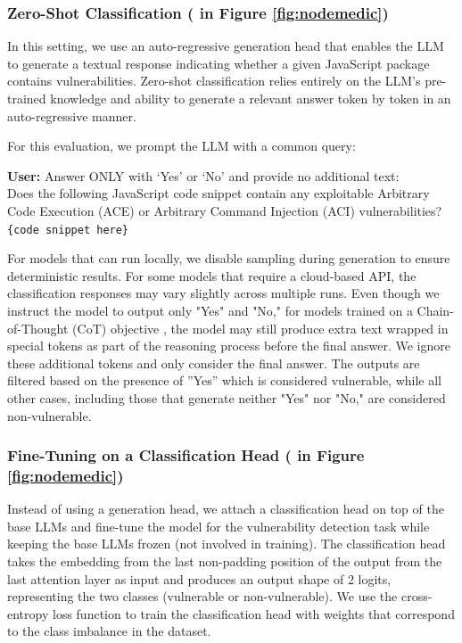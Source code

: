 \documentclass[12pt,openany,oneside,table]{cmuthesis}
\begin{document}
\subsubsection{Zero-Shot Classification \textup{( in Figure \ref{fig:nodemedic})}}
 
In this setting, we use an auto-regressive generation head that enables the LLM to generate a textual response indicating whether a given JavaScript package contains vulnerabilities. 
%
Zero-shot classification relies entirely on the LLM's pre-trained knowledge and ability to generate a relevant answer token by token in an auto-regressive manner.

For this evaluation, we prompt the LLM with a common query:
\begin{tcolorbox}[colback=gray!10, colframe=black, arc=3mm, boxrule=0.8pt]
    \textbf{User:} Answer ONLY with ‘Yes’ or ‘No’ and provide no additional text:\\
    Does the following JavaScript code snippet contain any exploitable Arbitrary Code Execution (ACE) or Arbitrary Command Injection (ACI) vulnerabilities?\\
    
    \texttt{\{code snippet here\}}
\end{tcolorbox}

For models that can run locally, we disable sampling during generation to ensure deterministic results. For some models that require a cloud-based API, the classification responses may vary slightly across multiple runs. 
Even though we instruct the model to output only "Yes" and "No," for models trained on a Chain-of-Thought (CoT) objective \cite{wei2022chain}, the model may still produce extra text wrapped in special tokens as part of the reasoning process before the final answer. We ignore these additional tokens and only consider the final answer.
%
The outputs are filtered based on the presence of ''Yes'' which is considered vulnerable, while all other cases, including those that generate neither "Yes" nor "No," are considered non-vulnerable.

\subsubsection{Fine-Tuning on a Classification Head \textup{( in Figure \ref{fig:nodemedic})}}

Instead of using a generation head, we attach a classification head on top of the base LLMs and fine-tune the model for the vulnerability detection task while keeping the base LLMs frozen (not involved in training). The classification head takes the embedding from the last non-padding position of the output from the last attention layer as input and produces an output shape of 2 logits, representing the two classes (vulnerable or non-vulnerable). We use the cross-entropy loss function to train the classification head with weights that correspond to the class imbalance in the dataset.
\end{document}
